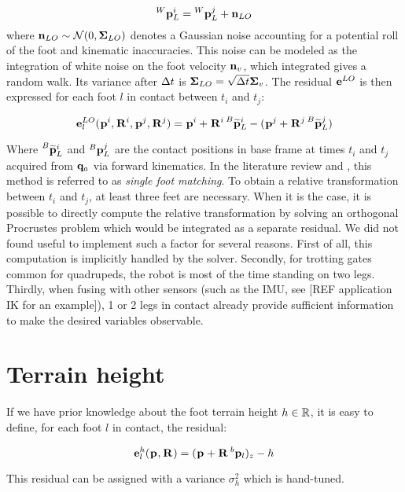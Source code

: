 \begin{equation}
    \prescript{W}{}{{\bf p}}_{L}^i = \prescript{W}{}{{\bf p}}_{L}^j + {\bf n}_{LO}
\end{equation}
%
where ${\bf n}_{LO} \sim \mathcal{N}({0},{{\bm \Sigma}_{LO}})$ denotes a Gaussian noise accounting for a potential roll of the foot and kinematic inaccuracies.
This noise can be modeled as the integration of white noise on the foot velocity ${\bf n}_v$, which integrated gives a random walk.  
Its variance after $\Delta t$ is ${\bm \Sigma}_{LO} = \sqrt{\Delta t} {\bm \Sigma}_v$.
The residual ${\bf e}^{LO}$ is then expressed for each foot $l$ in contact between $t_i$ and $t_j$:

\begin{equation}
    {\bf e}^{LO}_l(\prescript{}{}{{\bf p}}_{}^i, \prescript{}{}{{\bf R}}_{}^i, \prescript{}{}{{\bf p}}_{}^j, \prescript{}{}{{\bf R}}_{}^j) = \prescript{}{}{{\bf p}}_{}^i + \prescript{}{}{{\bf R}}_{}^i \prescript{B}{}{\widetilde{{\bf p}}}_{L}^i - (\prescript{}{}{{\bf p}}_{}^j + \prescript{}{}{{\bf R}}_{}^j \prescript{B}{}{\widetilde{{\bf p}}}_{L}^j)
\end{equation}

Where $\prescript{B}{}{\widetilde{{\bf p}}}_{L}^i$ and $\prescript{B}{}{{\bf p}}_{L}^j$ are the contact positions in base frame at times $t_i$ and $t_j$ acquired from ${\bf q}_a$ via forward kinematics. 
In the literature review and , this method is referred to as \textit{single foot matching}. To obtain
a relative transformation between $t_i$ and $t_j$, at least three feet are necessary. When it is the case, it is possible to directly compute the
relative transformation by solving an orthogonal Procrustes problem \cite{roston1991dead} which would be integrated as a separate residual.
We did not found useful to implement such a factor for several reasons. First of all, this computation is implicitly handled by the solver.
Secondly, for trotting gates common for quadrupeds, the robot is most of the time standing on two legs. Thirdly, when fusing with other sensors (such as the IMU,
see [REF application IK for an example]), 1 or 2 legs in contact already provide sufficient information to make the desired variables observable.



\section{Terrain height}
If we have prior knowledge about the foot terrain height $h \in \mathbb{R}$, it is easy to define, for each foot $l$ in contact, the residual:

\begin{equation}
    {\bf e}^h_l(\prescript{}{}{{\bf p}}_{}, \prescript{}{}{{\bf R}}_{}) = (\prescript{}{}{{\bf p}}_{} + \prescript{}{}{{\bf R}}_{} \prescript{b}{}{{\bf p}}_{l})_z - h
\end{equation}

This residual can be assigned with a variance $\sigma_h^2$ which is hand-tuned.

